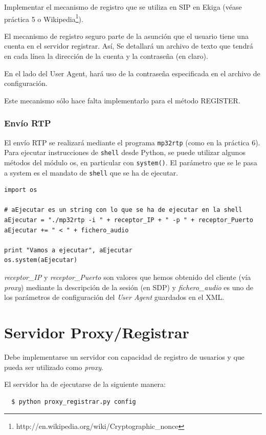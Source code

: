 \documentclass[a4paper,11pt]{article}
\begin{document}
Implementar el mecanismo de registro que se utiliza en SIP en Ekiga (véase práctica 5 o Wikipedia\footnote{http://en.wikipedia.org/wiki/Cryptographic\_nonce}).

El mecanismo de registro seguro parte de la asunción que el usuario tiene una cuenta en el servidor registrar. Así, Se detallará un archivo de texto que tendrá en cada línea la dirección de la cuenta y la contraseña (en claro). 

En el lado del User Agent, hará uso de la contraseña especificada en el archivo de configuración.


Este mecanismo sólo hace falta implementarlo para el método REGISTER.

\subsubsection{Envío RTP}

El envío RTP se realizará mediante el programa \texttt{mp32rtp} (como en la práctica 6). 
Para ejecutar instrucciones de \texttt{shell} desde Python, se puede utilizar algunos métodos del módulo os, en particular con \texttt{system()}. El parámetro que se le pasa a system es
el mandato de \texttt{shell} que se ha de ejecutar.

\begin{verbatim}
import os

# aEjecutar es un string con lo que se ha de ejecutar en la shell
aEjecutar = "./mp32rtp -i " + receptor_IP + " -p " + receptor_Puerto 
aEjecutar += " < " + fichero_audio

print "Vamos a ejecutar", aEjecutar
os.system(aEjecutar)
\end{verbatim}

\emph{receptor\_IP} y \emph{receptor\_Puerto} son valores que hemos obtenido del cliente (vía \emph{proxy}) mediante la descripción de la sesión (en SDP) y \emph{fichero\_audio} es uno de los parámetros de configuración del \emph{User Agent} guardados en el XML.

\section{Servidor Proxy/Registrar}


Debe implementarse un servidor con capacidad de registro de usuarios y que pueda ser utilizado como \emph{proxy}.

El servidor ha de ejecutarse de la siguiente manera:
\begin{verbatim}
  $ python proxy_registrar.py config
\end{verbatim}
\end{document}

